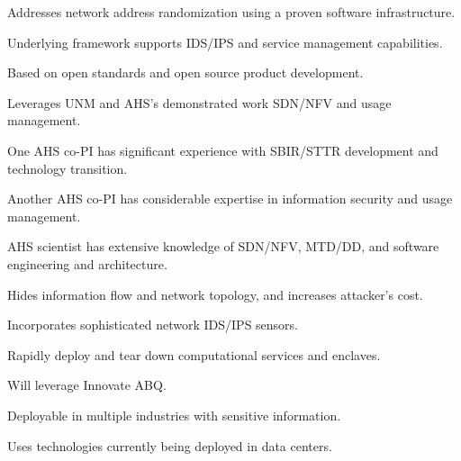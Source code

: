\documentclass{sbir}
\begin{document}
\begin{evalbox}
  \begin{evalitemize}
     \item Addresses network address randomization using a proven software infrastructure.
     \item Underlying framework supports IDS/IPS and service management capabilities.
  \end{evalitemize}
  \begin{evalitemize}
     \item Based on open standards and open source product development.
     \item Leverages UNM and AHS's demonstrated work SDN/NFV and usage management.
  \end{evalitemize}
  \begin{evalitemize}
     \item One AHS co-PI has significant experience with SBIR/STTR development and technology transition.
     \item Another AHS co-PI has considerable expertise in information security and usage management.
     \item AHS scientist has extensive knowledge of SDN/NFV, MTD/DD, and software engineering and architecture.
  \end{evalitemize}
  \begin{evalitemize}
     \item Hides information flow and network topology, and increases attacker's cost.
     \item Incorporates sophisticated network IDS/IPS sensors.
     \item Rapidly deploy and tear down computational services and enclaves.
  \end{evalitemize}
  \begin{evalitemize}
     \item Will leverage Innovate ABQ.
     \item Deployable in multiple industries with sensitive information.
     \item Uses technologies currently being deployed in data centers.
  \end{evalitemize}
\end{evalbox}
\end{document}
